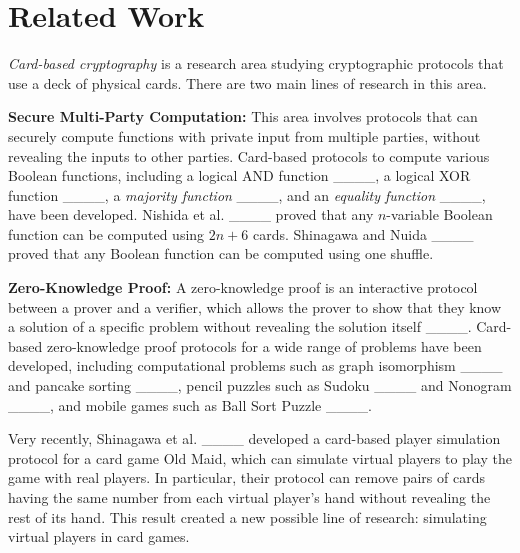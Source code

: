 \section{Related Work}
\textit{Card-based cryptography} is a research area studying cryptographic protocols that use a deck of physical cards. There are two main lines of research in this area.

\textbf{Secure Multi-Party Computation:} This area involves protocols that can securely compute functions with private input from multiple parties, without revealing the inputs to other parties. Card-based protocols to compute various Boolean functions, including a logical AND function ____, a logical XOR function ____, a \textit{majority function} ____, and an \textit{equality function} ____, have been developed. Nishida et al. ____ proved that any $n$-variable Boolean function can be computed using $2n+6$ cards. Shinagawa and Nuida ____ proved that any Boolean function can be computed using one shuffle. 

\textbf{Zero-Knowledge Proof:} A zero-knowledge proof is an interactive protocol between a prover and a verifier, which allows the prover to show that they know a solution of a specific problem without revealing the solution itself ____. Card-based zero-knowledge proof protocols for a wide range of problems have been developed, including computational problems such as graph isomorphism ____ and pancake sorting ____, pencil puzzles such as Sudoku ____ and Nonogram ____, and mobile games such as Ball Sort Puzzle ____.

Very recently, Shinagawa et al. ____ developed a card-based player simulation protocol for a card game Old Maid, which can simulate virtual players to play the game with real players. In particular, their protocol can remove pairs of cards having the same number from each virtual player's hand without revealing the rest of its hand. This result created a new possible line of research: simulating virtual players in card games.
